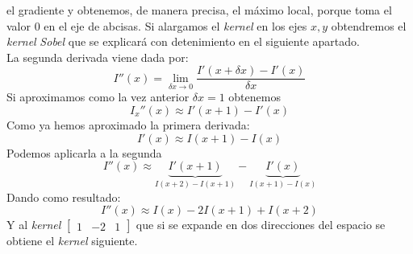 el gradiente y obtenemos, de manera precisa, el máximo local, porque
toma el valor $0$ en el eje de abcisas. Si alargamos el \emph{kernel}
en los ejes $x, y$ obtendremos el \emph{kernel}
\emph{Sobel} que se explicará con detenimiento en el siguiente apartado. \\
La segunda derivada viene dada por:
\begin{equation*}
  I''(x) = \lim_{\delta x \to 0}\frac{I'(x+\delta x) - I'(x)}{\delta x}
\end{equation*}
Si aproximamos como la vez anterior $\delta x = 1$ obtenemos
\begin{equation*}
  I_x''(x) \approx I'(x + 1) - I'(x)
\end{equation*}
Como ya hemos aproximado la primera derivada:
\begin{equation*}
  I'(x) \approx I(x + 1) - I(x)
\end{equation*}
Podemos aplicarla a la segunda
\begin{equation*}
  I''(x) \approx \underbrace{I'(x + 1)}_{I(x + 2) - I(x + 1)} - \underbrace{I'(x)}_{I(x + 1) - I(x)}
\end{equation*}
Dando como resultado:
\begin{equation*}
  I''(x) \approx I(x) - 2I(x + 1) + I(x + 2)
\end{equation*}
Y al \emph{kernel} $\begin{bmatrix} 1 & -2 & 1 \end{bmatrix}$ que si
se expande en dos direcciones del espacio se obtiene el \emph{kernel}
siguiente.

